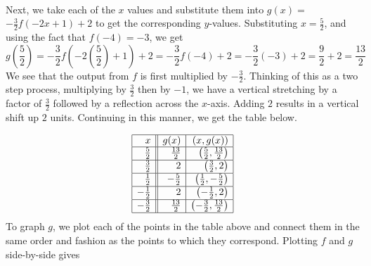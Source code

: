 \begin{example}
\[\begin{array}{|r||r|r|r|}
\end{array} \]

Next, we take each of the $x$ values and substitute them into $g(x) =$\\ $ -\frac{3}{2}f(-2x+1) +2$ to get the corresponding $y$-values.  Substituting  $x=\frac{5}{2}$, and using the fact that $f(-4)=-3$, we get \[g\left(\frac{5}{2}\right) = -\frac{3}{2}f\left(-2\left(\frac{5}{2}\right) +1\right) +2 = -\frac{3}{2} f(-4) + 2 = -\frac{3}{2}(-3) + 2 = \frac{9}{2} + 2 = \frac{13}{2}\]  We see that the output from $f$ is first multiplied by $-\frac{3}{2}$.  Thinking of this as a two step process, multiplying by $\frac{3}{2}$ then by $-1$, we have  a vertical stretching by a factor of $\frac{3}{2}$ followed by a reflection across the $x$-axis.  Adding $2$ results in a vertical shift up $2$ units.  Continuing in this manner, we get the table below.

\[ \begin{array}{|r||r|r|}  

\hline

 x & g(x) &  (x, g(x)) \\ \hline
\frac{5}{2}  & \frac{13}{2} &  \left(\frac{5}{2}, \frac{13}{2} \right) \\ [1pt] \hline
\frac{3}{2}  & 2 & \left(\frac{3}{2}, 2 \right)\\ [1pt] \hline
\frac{1}{2}  & - \frac{5}{2} & \left(\frac{1}{2}, -\frac{5}{2} \right)  \\ [1pt] \hline
-\frac{1}{2} & 2 &  \left(-\frac{1}{2}, 2 \right) \\ [1pt] \hline
-\frac{3}{2} & \frac{13}{2} &  \left(-\frac{3}{2}, \frac{13}{2} \right) \\ [1pt] \hline
\end{array} \] 
\newpage
To graph $g$, we plot each of the points in the table above and connect them in the same order and fashion as the points to which they correspond.  Plotting $f$ and $g$ side-by-side gives

\[ \begin{array}{ccc}


\end{array}\]
\end{example}
